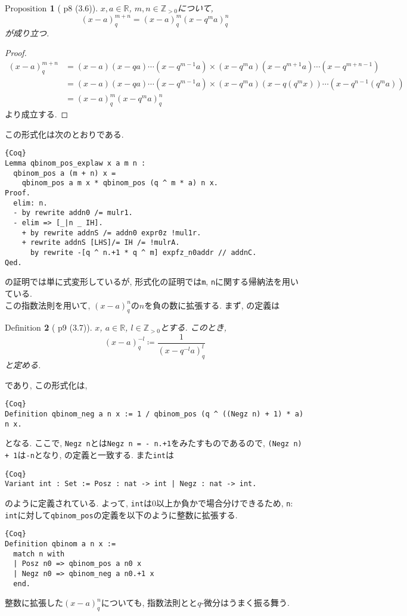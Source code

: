 \documentclass[11pt]{jarticle}
\theoremstyle{mystyle}
\newtheorem{df}{$\textrm{Definition}$}[subsection]
\newtheorem{prop}[df]{$\textrm{Proposition}$}
\newcommand{\bdf}{\begin{shadebox} \begin{df}}
\newcommand{\edf}{\end{df} \end{shadebox}}
\newcommand{\bprop}{\begin{shadebox} \begin{prop}}
\newcommand{\eprop}{\end{prop} \end{shadebox}}
\newcommand{\bpf}{\begin{proof}}
\newcommand{\epf}{\end{proof}}
\newcommand{\Z}{\mathbb{Z}}
\newcommand{\R}{\mathbb{R}}
\newcommand{\0}{\textbf{0}}
\newcommand{\1}{\textbf{1}}
\newcommand{\2}{\textbf{2}}
\begin{document}
\bprop[\cite{Kac} p8 (3.6)] \label{q_exp_low}
  $x,a\in\R$, $m,n\in\Z_{>0}$について, 
  \[
    (x-a)^{m+n}_q = (x-a)^m_q (x-q^ma)^n_q
  \]
  が成り立つ. 
\eprop
\bpf
  \begin{align*}
    (x-a)^{m+n}_q &= (x-a)(x-qa)\cdots(x-q^{m-1}a)
                         \times (x-q^ma)(x-q^{m+1}a)\cdots(x-q^{m+n-1})\\
                       &= (x-a)(x-qa)\cdots(x-q^{m-1}a)
                         \times (x-q^ma)(x-q(q^mx))\cdots(x-q^{n-1}(q^ma))\\
                       &= (x-a)^m_q(x-q^ma)^{n}_q
  \end{align*}
  より成立する.
\epf
この形式化は次のとおりである. 
\begin{lstlisting}{Coq}
Lemma qbinom_pos_explaw x a m n :
  qbinom_pos a (m + n) x =
    qbinom_pos a m x * qbinom_pos (q ^ m * a) n x.
Proof.
  elim: n.
  - by rewrite addn0 /= mulr1.
  - elim => [_|n _ IH].
    + by rewrite addnS /= addn0 expr0z !mul1r.
    + rewrite addnS [LHS]/= IH /= !mulrA.
      by rewrite -[q ^ n.+1 * q ^ m] expfz_n0addr // addnC.
Qed.
\end{lstlisting}
\cite{Kac}の証明では単に式変形しているが, 形式化の証明では{\tt m}, {\tt n}に関する帰納法を用いている. \\
この指数法則を用いて, $(x - a)^n_q$の$n$を負の数に拡張する. まず, \cite{Kac}の定義は
\bdf[\cite{Kac} p9 (3.7)] \label{qbinom_neg}
  $x$, $a \in \R$, $l\in\Z_{>0}$とする. このとき, 
  \[
    (x-a)^{-l}_q \coloneqq \frac{1}{(x-q^{-l}a)^l_q}
  \]
  と定める. 
\edf
であり, この形式化は, 
\begin{lstlisting}{Coq}
Definition qbinom_neg a n x := 1 / qbinom_pos (q ^ ((Negz n) + 1) * a) n x.
\end{lstlisting}
となる. ここで, {\tt Negz n}とは{\tt Negz n = - n.+1}をみたすものであるので, 
{\tt (Negz n) + 1}は{\tt -n}となり, \cite{Kac}の定義と一致する. また{\tt int}は
\begin{lstlisting}{Coq}
Variant int : Set := Posz : nat -> int | Negz : nat -> int.
\end{lstlisting}
のように定義されている. よって, {\tt int}は$0$以上か負かで場合分けできるため, 
{\tt n$\colon$int}に対して{\tt qbinom\_pos}の定義を以下のように整数に拡張する. 
\begin{lstlisting}{Coq}
Definition qbinom a n x :=
  match n with
  | Posz n0 => qbinom_pos a n0 x
  | Negz n0 => qbinom_neg a n0.+1 x
  end.
\end{lstlisting}
整数に拡張した$(x - a)^n_q$についても, 指数法則とと$q$-微分はうまく振る舞う.
\end{document}
